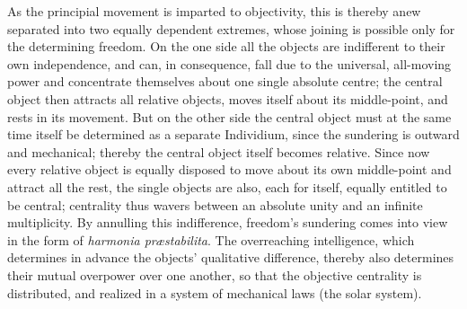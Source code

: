\documentclass[12pt]{book}
\begin{document}
As the principial movement is imparted to objectivity, this is thereby anew
separated into two equally dependent extremes, whose joining is possible
only for the determining freedom. On the one side all the objects are
indifferent to their own independence, and can, in consequence, fall due to
the universal, all-moving power and concentrate themselves about one single
absolute centre; the central object then attracts all relative objects,
moves itself about its middle-point, and rests in its movement. But on the
other side the central object must at the same time itself be determined as
a separate Individium, since the sundering is outward and mechanical;
thereby the central object itself becomes relative. Since now every relative
object is equally disposed to move about its own middle-point and attract
all the rest, the single objects are also, each for itself, equally entitled
to be central; centrality thus wavers between an absolute unity and an
infinite multiplicity. By annulling this indifference, freedom's sundering
comes into view in the form of \textit{harmonia præstabilita}. The
overreaching intelligence, which determines in advance the objects'
qualitative difference, thereby also determines their mutual overpower over
one another, so that the objective centrality is distributed, and realized
in a system of mechanical laws (the solar system).
\end{document}
